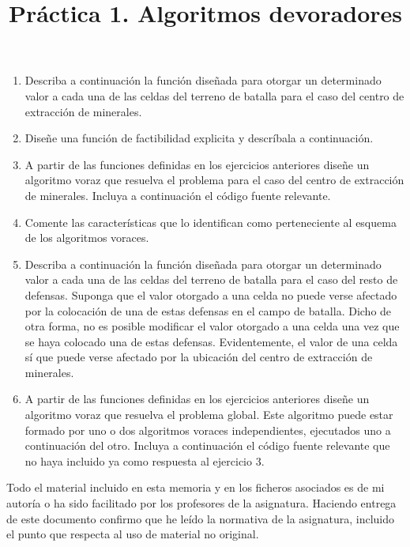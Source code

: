 \documentclass[]{article}
\title{Práctica 1. Algoritmos devoradores}
\author{}
\begin{document}
\maketitle


%

\begin{enumerate}
\item Describa a continuación la función diseñada para otorgar un determinado valor a cada una de las celdas del terreno de batalla para el caso del centro de extracción de minerales. 



\item Diseñe una función de factibilidad explicita y descríbala a continuación.



\item A partir de las funciones definidas en los ejercicios anteriores diseñe un algoritmo voraz que resuelva el problema para el caso del centro de extracción de minerales. Incluya a continuación el código fuente relevante. 



\item Comente las características que lo identifican como perteneciente al esquema de los algoritmos voraces. 



\item Describa a continuación la función diseñada para otorgar un determinado valor a cada una de las celdas del terreno de batalla para el caso del resto de defensas. Suponga que el valor otorgado a una celda no puede verse afectado por la colocación de una de estas defensas en el campo de batalla. Dicho de otra forma, no es posible modificar el valor otorgado a una celda una vez que se haya colocado una de estas defensas. Evidentemente, el valor de una celda sí que puede verse afectado por la ubicación del centro de extracción de minerales.



\item A partir de las funciones definidas en los ejercicios anteriores diseñe un algoritmo voraz que resuelva el problema global. Este algoritmo puede estar formado por uno o dos algoritmos voraces independientes, ejecutados uno a continuación del otro. Incluya a continuación el código fuente relevante que no haya incluido ya como respuesta al ejercicio 3. 



\end{enumerate}

Todo el material incluido en esta memoria y en los ficheros asociados es de mi autoría o ha sido facilitado por los profesores de la asignatura. Haciendo entrega de este documento confirmo que he leído la normativa de la asignatura, incluido el punto que respecta al uso de material no original.
\end{document}
